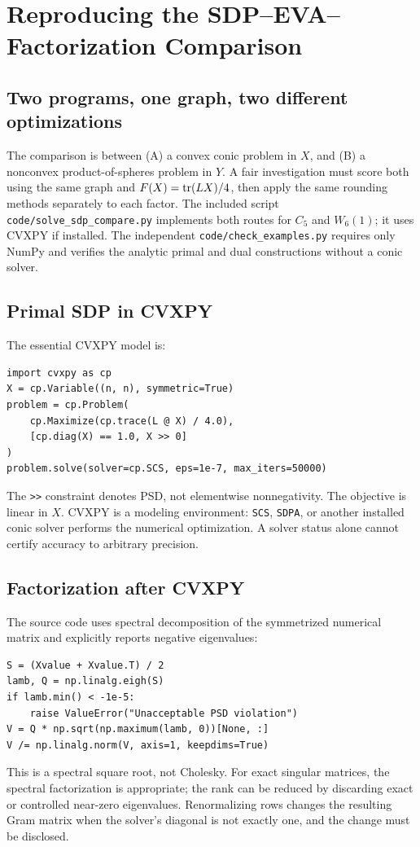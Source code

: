 \chapter{Reproducing the SDP--EVA--Factorization Comparison}\label{ch:reproduce}
\section{Two programs, one graph, two different optimizations}
The comparison is between (A) a convex conic problem in $X$, and (B) a nonconvex product-of-spheres problem in $Y$. A fair investigation must score both using the same graph and $F(X)=\operatorname{tr}(LX)/4$, then apply the same rounding methods separately to each factor. The included script \texttt{code/solve\_sdp\_compare.py} implements both routes for $C_5$ and $W_6(1)$; it uses CVXPY if installed. The independent \texttt{code/check\_examples.py} requires only NumPy and verifies the analytic primal and dual constructions without a conic solver.

\section{Primal SDP in CVXPY}
The essential CVXPY model is:
\begin{lstlisting}[style=py]
import cvxpy as cp
X = cp.Variable((n, n), symmetric=True)
problem = cp.Problem(
    cp.Maximize(cp.trace(L @ X) / 4.0),
    [cp.diag(X) == 1.0, X >> 0]
)
problem.solve(solver=cp.SCS, eps=1e-7, max_iters=50000)
\end{lstlisting}
The \texttt{>>} constraint denotes PSD, not elementwise nonnegativity. The objective is linear in $X$. CVXPY is a modeling environment: \texttt{SCS}, \texttt{SDPA}, or another installed conic solver performs the numerical optimization. A solver status alone cannot certify accuracy to arbitrary precision.

\section{Factorization after CVXPY}
The source code uses spectral decomposition of the symmetrized numerical matrix and explicitly reports negative eigenvalues:
\begin{lstlisting}[style=py]
S = (Xvalue + Xvalue.T) / 2
lamb, Q = np.linalg.eigh(S)
if lamb.min() < -1e-5:
    raise ValueError("Unacceptable PSD violation")
V = Q * np.sqrt(np.maximum(lamb, 0))[None, :]
V /= np.linalg.norm(V, axis=1, keepdims=True)
\end{lstlisting}
This is a spectral square root, not Cholesky. For exact singular matrices, the spectral factorization is appropriate; the rank can be reduced by discarding exact or controlled near-zero eigenvalues. Renormalizing rows changes the resulting Gram matrix when the solver's diagonal is not exactly one, and the change must be disclosed.

